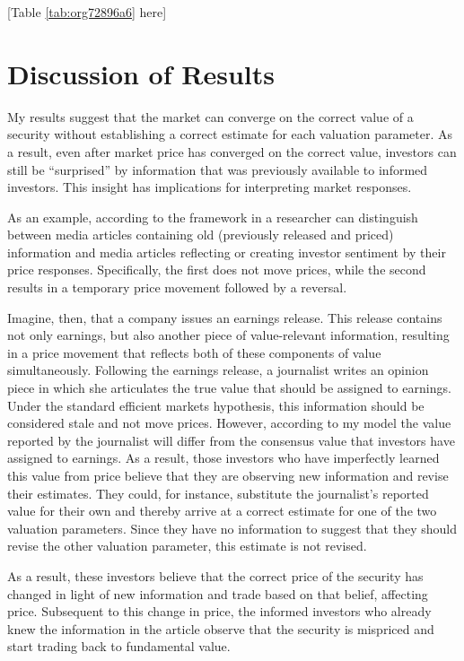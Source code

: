 \documentclass[11pt]{article}
\begin{document}
\begin{center}
[Table \ref{tab:org72896a6} here]
\end{center}

\section{Discussion of Results}
\label{sec:org1af4a47}
My results suggest that the market can converge on the correct value of a security without establishing a correct estimate for each valuation parameter. As a result, even after market price has converged on the correct value, investors can still be ``surprised'' by information that was previously available to informed investors. This insight has implications for interpreting market responses.

As an example, according to the framework in \citet{tetlockGivingContentInvestor2007} a researcher can distinguish between media articles containing old (previously released and priced) information and media articles reflecting or creating investor sentiment by their price responses. Specifically, the first does not move prices, while the second results in a temporary price movement followed by a reversal. 

Imagine, then, that a company issues an earnings release. This release contains not only earnings, but also another piece of value-relevant information, resulting in a price movement that reflects both of these components of value simultaneously. Following the earnings release, a journalist writes an opinion piece in which she articulates the true value that should be assigned to earnings. Under the standard efficient markets hypothesis, this information should be considered stale and not move prices. However, according to my model the value reported by the journalist will differ from the consensus value that investors have assigned to earnings. As a result, those investors who have imperfectly learned this value from price believe that they are observing new information and revise their estimates. They could, for instance, substitute the journalist's reported value for their own and thereby arrive at a correct estimate for one of the two valuation parameters. Since they have no information to suggest that they should revise the other valuation parameter, this estimate is not revised.

As a result, these investors believe that the correct price of the security has changed in light of new information and trade based on that belief, affecting price. Subsequent to this change in price, the informed investors who already knew the information in the article observe that the security is mispriced and start trading back to fundamental value. 
\end{document}
